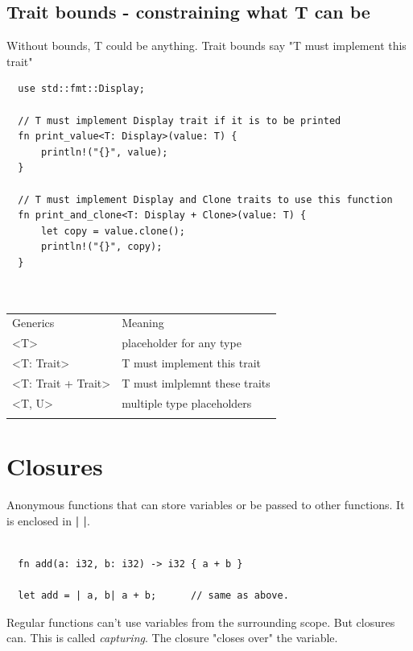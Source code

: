 \documentclass[11pt]{article}
\begin{document}
\subsection{Trait bounds - constraining what T can be}
\label{sec:org2b337e2}

Without bounds, T could be anything. Trait bounds say "T must implement this trait"

\begin{verbatim}
  use std::fmt::Display;

  // T must implement Display trait if it is to be printed
  fn print_value<T: Display>(value: T) {
      println!("{}", value);
  }

  // T must implement Display and Clone traits to use this function
  fn print_and_clone<T: Display + Clone>(value: T) {
      let copy = value.clone();
      println!("{}", copy);
  }



\end{verbatim}

\begin{center}
\begin{tabular}{ll}
Generics & Meaning\\
<T> & placeholder for any type\\
<T: Trait> & T must implement this trait\\
<T: Trait + Trait> & T must imlplemnt these traits\\
<T, U> & multiple type placeholders\\
 & \\
\end{tabular}
\end{center}
\section{Closures}
\label{sec:orgea5a709}

Anonymous functions that can store variables or be passed to other functions. It is enclosed in \textbf{| |}.

\begin{verbatim}

  fn add(a: i32, b: i32) -> i32 { a + b }

  let add = | a, b| a + b;      // same as above.

\end{verbatim}

Regular functions can't use variables from the surrounding scope. But closures can.
This is called \emph{capturing}. The closure "closes over" the variable.
\end{document}

